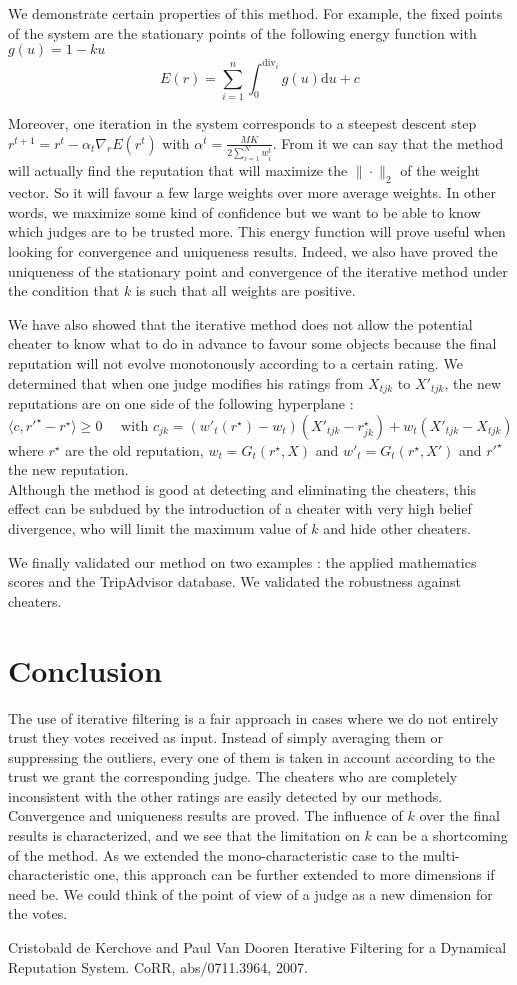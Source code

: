 \documentclass[9pt]{SelfArx} %
\begin{document}
We demonstrate certain properties of this method. For example, the fixed points of the system are the stationary points of the following energy function with $g(u) = 1 - k u$
\[
    E(r) = \sum_{i=1}^{n}\int_0^{\mathrm{div}_i} g(u) \mathrm{d}u + c
\]

Moreover, one iteration in the system corresponds to a steepest descent step $r^{t+1} = r^t - \alpha_t \nabla_r E(r^t)$ with $\alpha^t = \frac{MK}{2\sum_{i=1}^N w_i^t}$. From it we can say that the method will actually find the reputation that will maximize the $\| \cdot \|_2$ of the weight vector. So it will favour a few large weights over more average weights. In other words, we maximize some kind of confidence but we want to be able to know which judges are to be trusted more. This energy function will prove useful when looking for convergence and uniqueness results. Indeed, we also have proved the uniqueness of the stationary point and convergence of the iterative method under the condition that $k$ is such that all weights are positive.

We have also showed that the iterative method does not allow the potential cheater to know what to do in advance to favour some objects because the final reputation will not evolve monotonously according to a certain rating. We determined that when one judge modifies his ratings from $X_{tjk}$ to $X'_{tjk}$, the new reputations are on one side of the following hyperplane : 
\[ \langle c, r'^{\star} - r^{\star} \rangle \geq 0 \quad \text{ with } c_{jk} = ( w'_t(r^{\star})- w_t) (X'_{tjk}-r^{\star}_{jk}) + w_t(X'_{tjk}-X_{tjk}) \]
where $r^{\star}$ are the old reputation, $w_t = G_t(r^{\star},X)$ and $w'_t = G_t(r^{\star},X')$ and $r'^{\star}$ the new reputation. 
\\

Although the method is good at detecting and eliminating the cheaters, this effect can be subdued by the introduction of a cheater with very high belief divergence, who will limit the maximum value of $k$ and hide other cheaters.

We finally validated our method on two examples : the applied mathematics scores and the TripAdvisor database. We validated the robustness against cheaters.

\section*{Conclusion}
The use of iterative filtering is a fair approach in cases where we do not entirely trust they votes received as input. Instead of simply averaging them or suppressing the outliers, every one of them is taken in account according to the trust we grant the corresponding judge. The cheaters who are completely inconsistent with the other ratings are easily detected by our methods. Convergence and uniqueness results are proved. The influence of $k$ over the final results is characterized, and we see that the limitation on $k$ can be a shortcoming of the method.
As we extended the mono-characteristic case to the multi-characteristic one, this approach can be further extended to more dimensions if need be. We could think of the point of view of a judge as a new dimension for the votes.


\begin{thebibliography}{9}
          Cristobald de Kerchove and Paul Van Dooren
          Iterative Filtering for a Dynamical Reputation System.
          CoRR,
          abs/0711.3964,
          2007.
\end{thebibliography}
\end{document}

